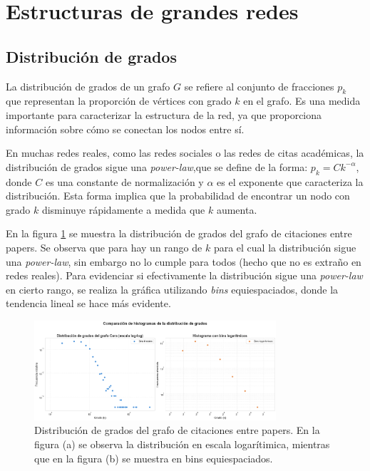 \documentclass{article}
\begin{document}
\section{Estructuras de grandes redes} \label{sec: estructuras}

\subsection{Distribución de grados}
La distribución de grados de un grafo $G$ se refiere al conjunto de fracciones $p_k$ que representan la proporción de vértices con grado $k$ en el grafo. Es una medida importante para caracterizar la estructura de la red, ya que proporciona información sobre cómo se conectan los nodos entre sí.

En muchas redes reales, como las redes sociales o las redes de citas académicas, la distribución de grados sigue una \textit{power-law},que se define de la forma: $p_k = Ck^{-\alpha}$, donde $C$ es una constante de normalización y $\alpha$ es el exponente que caracteriza la distribución. Esta forma implica que la probabilidad de encontrar un nodo con grado $k$ disminuye rápidamente a medida que $k$ aumenta.

En la figura \ref{fig: degree_distribution} se muestra la distribución de grados del grafo de citaciones entre papers. Se observa que para hay un rango de $k$ para el cual la distribución sigue una \textit{power-law}, sin embargo no lo cumple para todos (hecho que no es extraño en redes reales). Para evidenciar si efectivamente la distribución sigue una \textit{power-law} en cierto rango, se realiza la gráfica utilizando \textit{bins} equiespaciados, donde la tendencia lineal se hace más evidente.

\begin{figure}
    \centering
    \includegraphics[width=0.8\textwidth]{imagenes/dist_grado_Cora.png}
    \caption{Distribución de grados del grafo de citaciones entre papers. En la figura (a) se observa la distribución en escala logarítimica, mientras que en la figura (b) se muestra en bins equiespaciados.}
    \label{fig: degree_distribution}
\end{figure}
\end{document}
